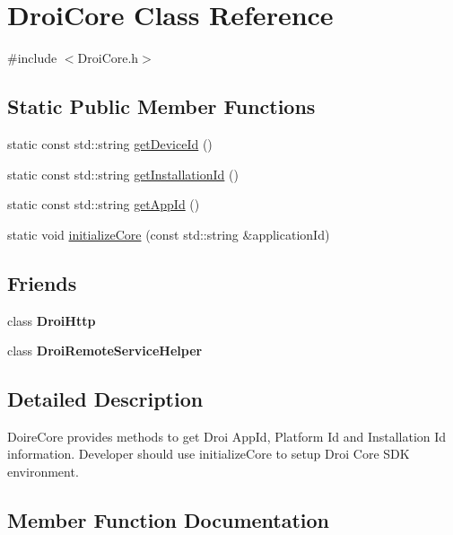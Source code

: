 \hypertarget{class_droi_core}{}\section{Droi\+Core Class Reference}
\label{class_droi_core}


{\ttfamily \#include $<$Droi\+Core.\+h$>$}

\subsection*{Static Public Member Functions}
\begin{DoxyCompactItemize}
\item 
static const std\+::string \hyperlink{class_droi_core_a81799368ed96e352f0f0e30dcc7606ae}{get\+Device\+Id} ()
\item 
static const std\+::string \hyperlink{class_droi_core_a9e6d6c3a1be97c6363dbce823d901169}{get\+Installation\+Id} ()
\item 
static const std\+::string \hyperlink{class_droi_core_ae0b543bd0feb2860829cf1b6387f0bf5}{get\+App\+Id} ()
\item 
static void \hyperlink{class_droi_core_a0e6c7e11c6c4985dfc472aa1f29fa9cd}{initialize\+Core} (const std\+::string \&application\+Id)
\end{DoxyCompactItemize}
\subsection*{Friends}
\begin{DoxyCompactItemize}
\item 
\mbox{\label{class_droi_core_ad04cb70e678402e663c95435df2a194e}} 
class {\bfseries Droi\+Http}
\item 
\mbox{\label{class_droi_core_a2a114914a3ccd688261064727ebe71cd}} 
class {\bfseries Droi\+Remote\+Service\+Helper}
\end{DoxyCompactItemize}


\subsection{Detailed Description}
Doire\+Core provides methods to get Droi App\+Id, Platform Id and Installation Id information. Developer should use initialize\+Core to setup Droi Core S\+DK environment. 

\subsection{Member Function Documentation}
\mbox{\label{class_droi_core_ae0b543bd0feb2860829cf1b6387f0bf5}} 
